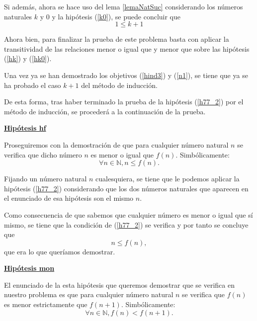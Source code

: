 \begin{demostracion}
\begin{itemize}
\begin{enumerate}
        Si además, ahora se hace uso del lema \ref{lemaNatSuc}
        considerando los números naturales \(k\) y \(0\) y la
        hipótesis (\ref{k0}), se puede concluir que
        \begin{equation}\label{hk0}\tag{hk0}
          1 ≤ k+1
        \end{equation}

        Ahora bien, para finalizar la prueba de este problema basta
        con aplicar la transitividad de las relaciones menor o igual que
        y menor que sobre las hipótesis (\ref{hk}) y (\ref{hk0}).

      \end{enumerate}

    Una vez ya se han demostrado los objetivos (\ref{hind3}) y
    (\ref{n1}), se tiene que ya se ha probado el caso \(k+1\) del
    método de inducción.
    \end{itemize}

  De esta forma, tras haber terminado la prueba de la hipótesis
  (\ref{h77_2}) por el método de inducción, se procederá a la
  continuación de la prueba.

  \noindent
  \textbf{\underline{Hipótesis hf}}

  Proseguiremos con la demostración de que para cualquier número
  natural \(n\) se verifica que dicho número \(n\) es menor o igual
  que \(f(n)\). Simbólicamente:
  \begin{equation}\label{hf}\tag{hf}
    ∀n∈ ℕ, n ≤ f(n).
  \end{equation}

  Fijando un número natural \(n\) cualesquiera, se tiene que le
  podemos aplicar la hipótesis (\ref{h77_2}) considerando que los dos
  números naturales que aparecen en el enunciado de esa hipótesis
  son el mismo \(n\).

  Como consecuencia de que sabemos que cualquier número es menor
  o igual que sí mismo, se tiene que la condición de (\ref{h77_2}) se
  verifica y por tanto se concluye que
  \begin{equation}
    n ≤ f(n),
  \end{equation}
  que era lo que queríamos demostrar.

  \noindent
  \textbf{\underline{Hipótesis mon}}

  El enunciado de la esta hipótesis que queremos demostrar que se
  verifica en nuestro problema es que para cualquier número natural
  \(n\) se verifica que \(f(n)\) es menor estrictamente que \(f(n+1)\).
  Simbólicamente:
  \begin{equation}\label{mon}\tag{mon}
    ∀n ∈ ℕ, f(n) < f(n+1).
  \end{equation}


\end{demostracion}

